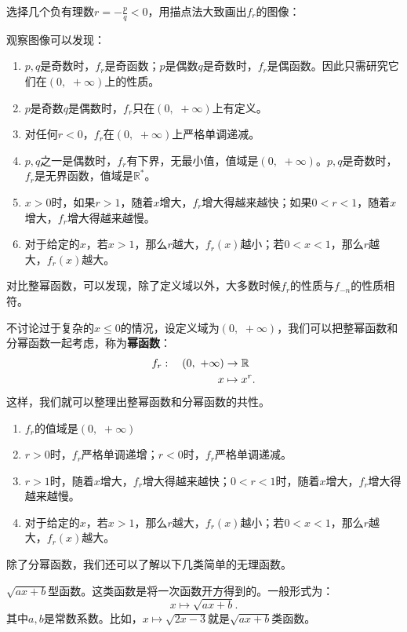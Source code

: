 \documentclass[12pt,UTF8]{ctexbook}
\begin{document}
选择几个负有理数$r = -\frac{p}{q} < 0$，用描点法大致画出$f_r$的图像：


观察图像可以发现：
\begin{enumerate}
    \item $p, q$是奇数时，$f_r$是奇函数；$p$是偶数$q$是奇数时，$f_r$是偶函数。因此只需研究它们在$(0, \,\,  +\infty)$上的性质。
    \item $p$是奇数$q$是偶数时，$f_r$只在$(0, \,\, +\infty)$上有定义。
    \item 对任何$r < 0$，$f_r$在$(0, \,\, +\infty)$上严格单调递减。
    \item $p, q$之一是偶数时，$f_r$有下界，无最小值，值域是$(0, \,\, +\infty)$。$p, q$是奇数时，$f_r$是无界函数，值域是$\mathbb{R}^*$。
    \item $x>0$时，如果$r>1$，随着$x$增大，$f_r$增大得越来越快；如果$0 < r < 1$，随着$x$增大，$f_r$增大得越来越慢。
    \item 对于给定的$x$，若$x>1$，那么$r$越大，$f_r(x)$越小；若$0 < x<1$，那么$r$越大，$f_r(x)$越大。
\end{enumerate}
对比整幂函数，可以发现，除了定义域以外，大多数时候$f_r$的性质与$f_{-n}$的性质相符。

不讨论过于复杂的$x\leqslant 0$的情况，设定义域为$(0, \,\, +\infty)$，我们可以把整幂函数和分幂函数一起考虑，称为\textbf{幂函数}：
\begin{align}
    f_r :\quad (0, \,\, +\infty) &\rightarrow \mathbb{R} \notag \\
    x &\mapsto x^r. \notag
\end{align}
这样，我们就可以整理出整幂函数和分幂函数的共性。
\begin{enumerate}
    \item $f_r$的值域是$(0, \,\, +\infty)$
    \item $r > 0$时，$f_r$严格单调递增；$r < 0$时，$f_r$严格单调递减。
    \item $r>1$时，随着$x$增大，$f_r$增大得越来越快；$0 < r < 1$时，随着$x$增大，$f_r$增大得越来越慢。
    \item 对于给定的$x$，若$x>1$，那么$r$越大，$f_r(x)$越小；若$0 < x<1$，那么$r$越大，$f_r(x)$越大。
\end{enumerate}

除了分幂函数，我们还可以了解以下几类简单的无理函数。

$\sqrt{ax + b}$型函数。这类函数是将一次函数开方得到的。一般形式为：
$$ x\mapsto \sqrt{ax + b}.$$
其中$a, b$是常数系数。比如，$x\mapsto \sqrt{2x - 3}$就是$\sqrt{ax + b}$类函数。
\end{document}
